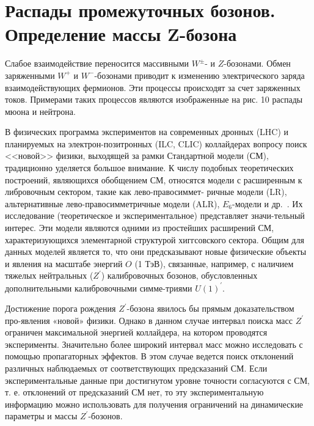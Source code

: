 \section{Распады промежуточных бозонов. Определение массы Z-бозона}

Слабое взаимодействие переносится массивными $W^±$- и $Z$-бозонами. Обмен заряженными $W^+$ и $W^-$-бозонами приводит к изменению электрического заряда взаимодействующих фермионов. Эти процессы происходят за счет заряженных токов. Примерами таких процессов являются изображенные на рис. 10 распады мюона и нейтрона.

В физических программа экспериментов на  современных  дронных (LHC) и планируемых на  электрон-позитронных (ILC, CLIC) коллайдерах вопросу поиск  <<новой>> физики, выходящей за  рамки Стандартной модели (СМ), традиционно уделяется большое внимание. К числу подобных теоретических построений, являющихся обобщением СМ, относятся модели с расширенным к либровочным сектором, такие как лево-правосиммет- 
ричные модели (LR), альтернативные лево-правосимметричные модели (ALR), $E_6$-модели
и др.~\cite{Bobovnikov:2016}. Их исследование (теоретическое и экспериментальное) представляет значи-тельный интерес. Эти модели являются одними из простейших расширений СМ, характеризующихся элементарной структурой хиггсовского сектора. Общим для данных моделей является то, что они предсказывают новые физические объекты и явления на масштабе энергий $O$ (1 ТэВ), связанные, например, с наличием тяжелых нейтральных ($Z^\prime$) калибровочных бозонов, обусловленных дополнительными калибровочными симме-триями $U(1)^\prime$.

Достижение порога рождения $Z^\prime$-бозона явилось бы прямым доказательством про-явления «новой» физики. Однако в данном случае интервал поиска масс $Z^\prime$ ограничен максимальной энергией коллайдера, на котором проводятся эксперименты. Значительно более широкий интервал масс можно исследовать с помощью пропагаторных эффектов. В этом случае ведется поиск отклонений различных наблюдаемых от соответствующих предсказаний СМ. Если экспериментальные данные при достигнутом уровне точности согласуются с СМ, т. е. отклонений от предсказаний СМ нет, то эту экспериментальную информацию можно использовать для получения ограничений на динамические параметры и массы $Z^\prime$-бозонов.

